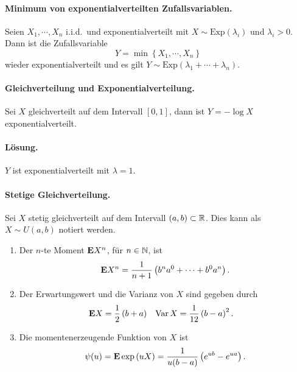 \paragraph{Minimum von exponentialverteilten Zufallsvariablen.}
Seien $X_1, \cdots, X_n$ i.i.d.\ und exponentialverteilt mit $X\sim \text{Exp}(\lambda_i)$
und $\lambda_i>0$. Dann ist die Zufallsvariable 
\begin{equation*}
    Y = \min \left\{ X_1, \cdots, X_n \right\} 
\end{equation*}
wieder exponentialverteilt und es gilt $Y \sim
\text{Exp}(\lambda_1+\cdots+\lambda_n)$.

\paragraph{Gleichverteilung und Exponentialverteilung. } Sei $X$ gleichverteilt
auf dem Intervall $[0,1]$, dann ist $Y = -\log X$ exponentialverteilt.

\paragraph*{Lösung. } $Y$ ist exponentialverteilt mit $\lambda=1$.

\paragraph{Stetige Gleichverteilung.}
Sei $X$ stetig gleichverteilt auf dem Intervall $\left( a,b \right)\subset \mathbb R$.  
Dies kann als $X \sim U(a,b)$ notiert werden. 
\begin{enumerate}
    \item Der $n$-te Moment $\mathbf{E} X^{n}$, für $n\in\mathbb N$, ist 
        \begin{equation*}
            \mathbf{E} X^n = \frac{1}{n+1}\left( b^{n}a^0 + \cdots + b^{0}a^{n} \right).
        \end{equation*}
    \item Der Erwartungswert und die Varianz von $X$ sind gegeben durch
        \begin{align*}
            \mathbf{E} X    & = \frac{1}{2} \left( b+a \right) & 
            \operatorname{Var} X  & = \frac{1}{12} \left( b-a \right)^{2}.  
        \end{align*}
    \item Die momentenerzeugende Funktion von $X$ ist 
        \begin{equation*}
            \psi(u) = \mathbf{E} \exp \left( u X \right) = \frac{1}{u(b-a)}\left( e^{ub} - e^{ua} \right).
        \end{equation*}
\end{enumerate}
